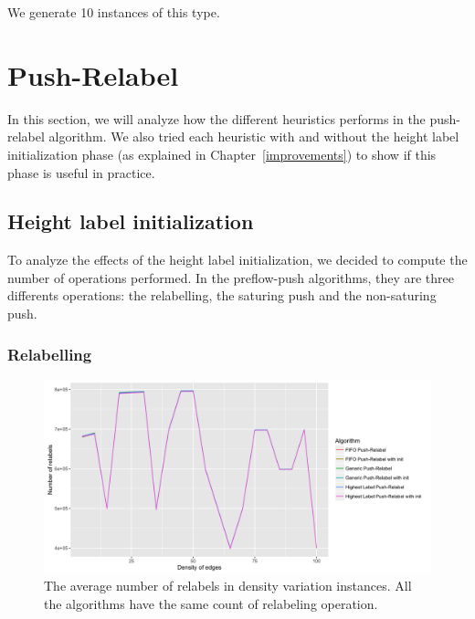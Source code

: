 We generate 10 instances of this type.



\section{Push-Relabel}

In this section, we will analyze how the different heuristics performs in the push-relabel algorithm. We also tried each heuristic with and without the height label initialization phase (as explained in Chapter~\ref{improvements}) to show if this phase is useful in practice.
\subsection{Height label initialization}

To analyze the effects of the height label initialization, we decided to compute the number of operations performed. In the preflow-push algorithms, they are three differents operations: the relabelling, the saturing push and the non-saturing push.

\subsubsection{Relabelling}
\begin{figure}[H]
\begin{center}
\includegraphics[scale=0.13]{images/meanrelabels.png}
\caption{The average number of relabels in density variation instances. All the algorithms have the same count of relabeling operation.}
\label{fig:mean_relabel}
\end{center}
\end{figure}

